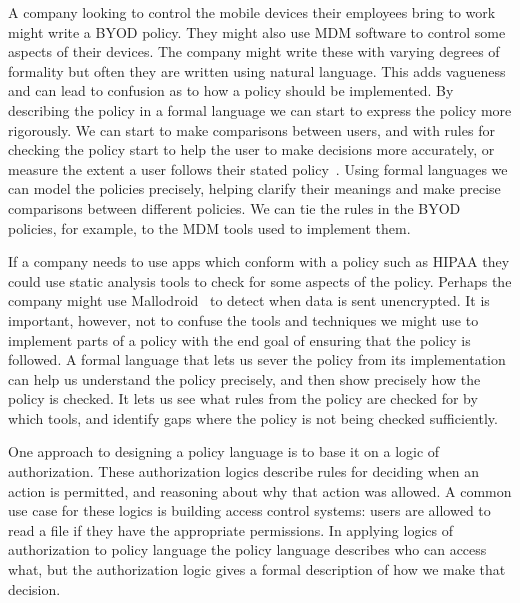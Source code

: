 \documentclass[thesis.tex]{subfiles}
\begin{document}
A company looking to control the mobile devices their employees bring
to work might write a \ac{BYOD} policy.  They might also use \ac{MDM}
software to control some aspects of their devices.  The company might
write these with varying degrees of formality but often they are
written using natural language.  This adds vagueness and can lead to
confusion as to how a policy should be implemented.  By describing the
policy in a formal language we can start to express the policy more
rigorously.  We can start to make comparisons between users, and with
rules for checking the policy start to help the user to make decisions
more accurately, or measure the extent a user follows their stated
policy~\cite{hallett_apppal_2016}.  Using formal languages we can
model the policies precisely, helping clarify their meanings and make
precise comparisons between different policies.  We can tie the rules
in the \ac{BYOD} policies, for example, to the \ac{MDM} tools used to
implement them.

If a company needs to use apps which conform with a policy such as
\ac{HIPAA} they could use static analysis tools to check for some
aspects of the policy.  Perhaps the company might use
Mallodroid~\cite{fahl_why_2012} to detect when data is sent
unencrypted.  It is important, however, not to confuse the tools and
techniques we might use to implement parts of a policy with the end
goal of ensuring that the policy is followed.  A formal language that
lets us sever the policy from its implementation can help us
understand the policy precisely, and then show precisely how the
policy is checked.  It lets us see what rules from the policy are
checked for by which tools, and identify gaps where the policy is not
being checked sufficiently.



One approach to designing a policy language is to base it on a logic
of authorization.  These authorization logics describe rules for
deciding when an action is permitted, and reasoning about why that
action was allowed.  A common use case for these logics is building
access control systems: users are allowed to read a file if they have
the appropriate permissions.  In applying logics of authorization to
policy language the policy language describes who can access what, but
the authorization logic gives a formal description of how we make that
decision.
\end{document}
